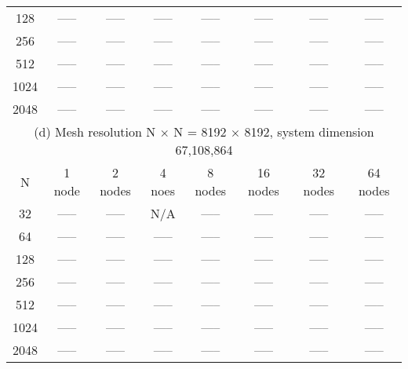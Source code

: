 \documentclass[11pt]{article}
\begin{document}
\begin{table}[!htbp]
{\begin{tabular}{ |c|c|c|c|c|c|c|c| }
128  & ----- & ----- & ----- & ----- & ----- & ----- & ----- \\
256  & ----- & ----- & ----- & ----- & ----- & ----- & ----- \\
512  & ----- & ----- & ----- & ----- & ----- & ----- & ----- \\
1024 & ----- & ----- & ----- & ----- & ----- & ----- & ----- \\
2048 & ----- & ----- & ----- & ----- & ----- & ----- & ----- \\
\hline
\hline
\multicolumn{8}{|c|}{(d) Mesh resolution N $\times$ N = 8192 $\times$ 8192, system dimension 67,108,864}\\
\hline
N & 1 node & 2 nodes & 4 noes & 8 nodes & 16 nodes & 32 nodes & 64 nodes \\
\hline
32   & ----- & ----- & N/A   & ----- & ----- & ----- & ----- \\
64   & ----- & ----- & ----- & ----- & ----- & ----- & ----- \\
128  & ----- & ----- & ----- & ----- & ----- & ----- & ----- \\
256  & ----- & ----- & ----- & ----- & ----- & ----- & ----- \\
512  & ----- & ----- & ----- & ----- & ----- & ----- & ----- \\
1024 & ----- & ----- & ----- & ----- & ----- & ----- & ----- \\
2048 & ----- & ----- & ----- & ----- & ----- & ----- & ----- \\
\hline
\end{tabular}
}
\end{table}
\end{document}
